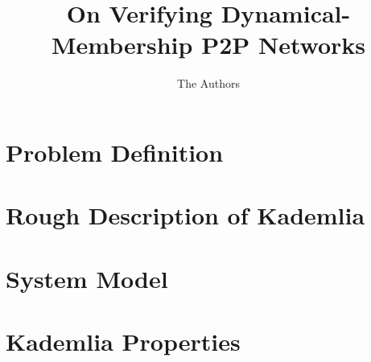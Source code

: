\documentclass[acm,draft]{paper}
\begin{document}
\title{On Verifying Dynamical-Membership P2P Networks}

\author{The Authors}

\begin{abstract}

\end{abstract}

\maketitle
\pagestyle{plain}

\section{Problem Definition}
\label{sec:intro}


\section{Rough Description of Kademlia}


\section{System Model}


\section{Kademlia Properties}



\end{document}
